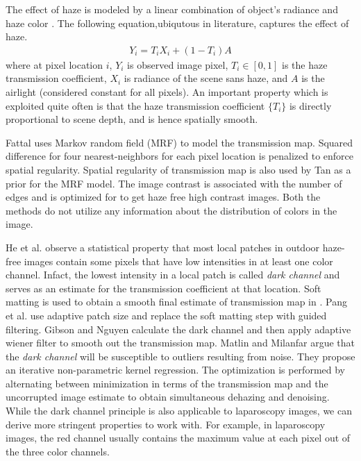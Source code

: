 The effect of haze is modeled by a linear combination of object's radiance and haze color \cite{koschmieder1925smokemodel}. The following equation,ubiqutous in literature, captures the effect of haze.
\begin{align}
    Y_i = T_i X_i + \left( 1 - T_i \right) A \label{eqn:hazemodel}
\end{align}
where at pixel location $i$, $Y_i$ is observed image pixel, $T_i \in [0, 1]$ is the haze transmission coefficient, $X_i$ is radiance of the scene sans haze, and $A$ is the airlight (considered constant for all pixels). An important property which is exploited quite often is that the haze transmission coefficient $\lbrace T_i \rbrace$ is directly proportional to scene depth, and is hence spatially smooth.

Fattal \cite{fattal2008single} uses Markov random field (MRF) to model the transmission map. Squared difference for four nearest-neighbors for each pixel location is penalized to enforce spatial regularity. Spatial regularity of transmission map is also used by Tan \cite{tan2008visibility} as a prior for the MRF model. The image contrast is associated with the number of edges and is optimized for to get haze free high contrast images. Both the methods do not utilize any information about the distribution of colors in the image.

He et al. \cite{he2011dark} observe a statistical property that most local patches in outdoor haze-free images contain some pixels that have low intensities in at least one color channel. Infact, the lowest intensity in a local patch is called \emph{dark channel} and serves as an estimate for the transmission coefficient at that location. Soft matting is used to obtain a smooth final estimate of transmission map in \cite{he2011dark}. Pang et al. \cite{pang2011improved} use adaptive patch size and replace the soft matting step with guided filtering. Gibson and Nguyen \cite{gibson2013wiener} calculate the dark channel and then apply adaptive wiener filter to smooth out the transmission map. Matlin and Milanfar \cite{matlin2012removal} argue that the \emph{dark channel} will be susceptible to outliers resulting from noise. They propose an iterative non-parametric kernel regression. The optimization is performed by alternating between minimization in terms of the transmission map and the uncorrupted image estimate to obtain simultaneous dehazing and denoising. While the dark channel principle is also applicable to laparoscopy images, we can derive more stringent properties to work with. For example, in laparoscopy images, the red channel usually contains the maximum value at each pixel out of the three color channels. 

